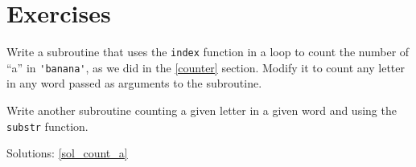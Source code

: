 \section{Exercises}


\begin{exercise}
\label{count_a}

Write a subroutine that uses the {\tt index} function in a 
loop to count the number of ``a'' in \verb"'banana'",
as we did in the \ref{counter} section. Modify it to count 
any letter in any word passed as arguments to the subroutine.

Write another subroutine counting a given letter in a given 
word and using the {\tt substr} function.

Solutions: \ref{sol_count_a}
\end{exercise}


